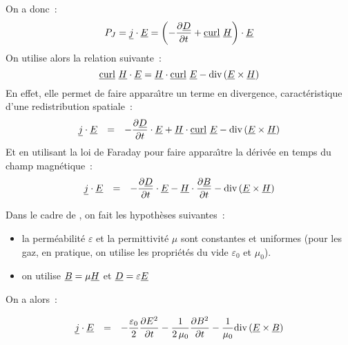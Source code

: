 On a donc~:
\begin{equation}
P_J=\underline{j}\cdot\underline{E}=\left(-\frac{\partial \underline{D}}{\partial t} +\underline{\text{curl}}\ \underline{H}\right)\cdot\underline{E}
\end{equation}
On utilise alors la relation suivante~:
\begin{equation}
\underline{\text{curl}}\ \underline{H}\cdot\underline{E}=\underline{H}\cdot\underline{\text{curl}}\ \underline{E}-\text{div}\,(\underline{E}\times\underline{H})
\end{equation}
En effet, elle permet de faire appara\^\i tre un
terme en divergence, caractéristique d'une redistribution spatiale~:
\begin{equation}
\begin{array}{lll}
\underline{j}\cdot\underline{E}&=&
\displaystyle-\frac{\partial \underline{D}}{\partial t}\cdot\underline{E}
+\underline{H}\cdot\underline{\text{curl}}\ \underline{E}-\text{div}\,(\underline{E}\times\underline{H})\\
\end{array}
\end{equation}
Et en utilisant la loi de Faraday pour faire appara\^\i tre la dérivée en temps du champ magnétique~:
\begin{equation}
\begin{array}{lll}
\underline{j}\cdot\underline{E}&=&
\displaystyle-\frac{\partial \underline{D}}{\partial t}\cdot\underline{E}
-\underline{H}\cdot\frac{\partial \underline{B}}{\partial t}-\text{div}\,(\underline{E}\times\underline{H})\\
\end{array}
\end{equation}

Dans le cadre de \CS, on fait les hypothèses suivantes~:
\begin{itemize}
\item la perméabilité $\varepsilon$ et la permittivité $\mu$
sont constantes et uniformes (pour les gaz, en pratique, on utilise
les propriétés du vide $\varepsilon_0$ et $\mu_0$).
\item on utilise $\underline{B} = \mu \underline{H}$ et $\underline{D} = \varepsilon \underline{E}$
\end{itemize}

On a alors~:

\begin{equation}
\begin{array}{lll}
\displaystyle\underline{j}\cdot\underline{E}&=&
\displaystyle-\frac{\varepsilon_0}{2}\frac{\partial E^2}{\partial t}
-\frac{1}{2\,\mu_0}\frac{\partial B^2}{\partial t}
-\frac{1}{\mu_0}\text{div}\,(\underline{E}\times\underline{B})
\end{array}
\end{equation}

